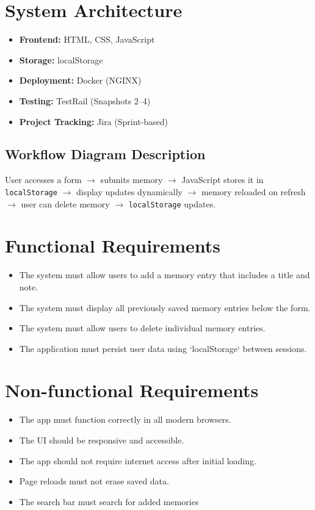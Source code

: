 \documentclass[12pt]{article}
\begin{document}
\section{System Architecture}
\begin{itemize}
  \item \textbf{Frontend:} HTML, CSS, JavaScript
  \item \textbf{Storage:} localStorage
  \item \textbf{Deployment:} Docker (NGINX)
  \item \textbf{Testing:} TestRail (Snapshots 2--4)
  \item \textbf{Project Tracking:} Jira (Sprint-based)
\end{itemize}

\subsection*{Workflow Diagram Description}
User accesses a form $\rightarrow$ submits memory $\rightarrow$ JavaScript stores it in \texttt{localStorage} $\rightarrow$ display updates dynamically $\rightarrow$ memory reloaded on refresh $\rightarrow$ user can delete memory $\rightarrow$ \texttt{localStorage} updates.

\section{Functional Requirements}
\begin{itemize}
  \item The system must allow users to add a memory entry that includes a title and note.
  \item The system must display all previously saved memory entries below the form.
  \item The system must allow users to delete individual memory entries.
  \item The application must persist user data using `localStorage` between sessions.
\end{itemize}

\section{Non-functional Requirements}
\begin{itemize}
  \item The app must function correctly in all modern browsers.
  \item The UI should be responsive and accessible.
  \item The app should not require internet access after initial loading.
  \item Page reloads must not erase saved data.
  \item The search bar must search for added memories
\end{itemize}
\end{document}
